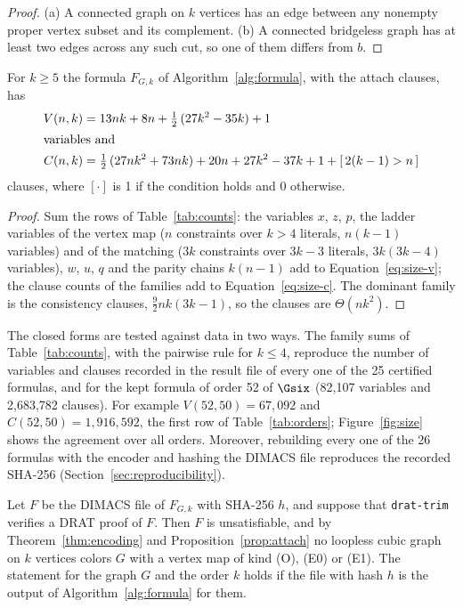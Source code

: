 \begin{proof}
(a) A connected graph on $k$ vertices has an edge between any nonempty proper vertex subset and its complement. (b) A connected bridgeless graph has at least two edges across any such cut, so one of them differs from $b$.
\end{proof}

\begin{proposition}\label{prop:size}
For $k \ge 5$ the formula $F_{G,k}$ of Algorithm~\ref{alg:formula}, with the attach clauses, has
\begin{align}
V(n,k) &= 13nk + 8n + \tfrac12\,(27k^2 - 35k) + 1 \label{eq:size-v}\\
\intertext{variables and}
C(n,k) &= \tfrac12\,(27nk^2 + 73nk) + 20n + 27k^2 - 37k + 1 + [\,2(k-1) > n\,] \label{eq:size-c}
\end{align}
clauses, where $[\cdot]$ is 1 if the condition holds and 0 otherwise.
\end{proposition}

\begin{proof}
Sum the rows of Table~\ref{tab:counts}: the variables $x$, $z$, $p$, the ladder variables of the vertex map ($n$ constraints over $k > 4$ literals, $n(k-1)$ variables) and of the matching ($3k$ constraints over $3k-3$ literals,
$3k(3k-4)$ variables), $w$, $u$, $q$ and the parity chains $k(n-1)$ add to Equation~\eqref{eq:size-v}; the clause counts of the families add to Equation~\eqref{eq:size-c}. The dominant family is the consistency clauses, $\tfrac92 nk(3k-1)$, so the
clauses are $\Theta(nk^2)$.
\end{proof}

The closed forms are tested against data in two ways. The family sums of Table~\ref{tab:counts}, with the pairwise rule for $k \le 4$, reproduce the number of variables and clauses recorded in the result file of every one of the 25 certified
formulas, and for the kept formula of order 52 of $\Gsix$ (82{,}107 variables and 2{,}683{,}782 clauses). For example $V(52,50) = 67{,}092$ and $C(52,50) = 1{,}916{,}592$, the first row of Table~\ref{tab:orders}; Figure~\ref{fig:size} shows the agreement over all orders.
Moreover, rebuilding every one of the 26 formulas with the encoder and hashing the DIMACS file reproduces the recorded SHA-256 (Section~\ref{sec:reproducibility}).

\begin{proposition}\label{prop:certified}
Let $F$ be the DIMACS file of $F_{G,k}$ with SHA-256 $h$, and suppose that \texttt{drat-trim} verifies a DRAT proof of $F$. Then $F$ is unsatisfiable, and by Theorem~\ref{thm:encoding} and Proposition~\ref{prop:attach} no
loopless cubic graph on $k$ vertices colors $G$ with a vertex map of kind (O), (E0) or (E1). The statement for the graph $G$ and the order $k$ holds if the file with hash $h$ is the output of Algorithm~\ref{alg:formula} for them.
\end{proposition}

